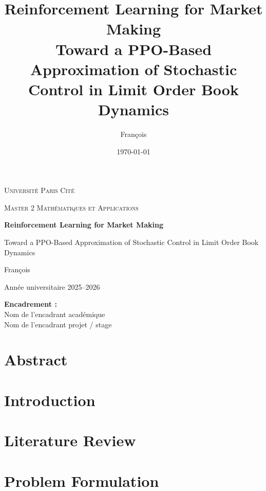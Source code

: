 \documentclass[11pt,a4paper,oneside]{report}
\title{Reinforcement Learning for Market Making\\[0.3em]
\large Toward a PPO-Based Approximation of Stochastic Control in Limit Order Book Dynamics}
\author{François}
\date{\today}
\begin{document}
\begin{titlepage}
    \centering
    {\scshape\LARGE Université Paris Cité \par}
    \vspace{1.2cm}
    {\scshape\Large Master 2 Mathématiques et Applications\par}
    \vspace{1.8cm}
    {\huge\bfseries Reinforcement Learning for Market Making\par}
    \vspace{0.4cm}
    {\Large Toward a PPO-Based Approximation of Stochastic Control in Limit Order Book Dynamics\par}
    \vspace{2cm}

    {\Large François \par}
    \vspace{0.5cm}
    {\large Année universitaire 2025--2026\par}

    \vfill

    \begin{flushleft}
        \textbf{Encadrement :} \\
        Nom de l'encadrant académique \\
        Nom de l'encadrant projet / stage
    \end{flushleft}

    \vfill
\end{titlepage}


\chapter*{Abstract}


\tableofcontents
\clearpage


\chapter{Introduction}


\chapter{Literature Review}


\chapter{Problem Formulation}

\end{document}
